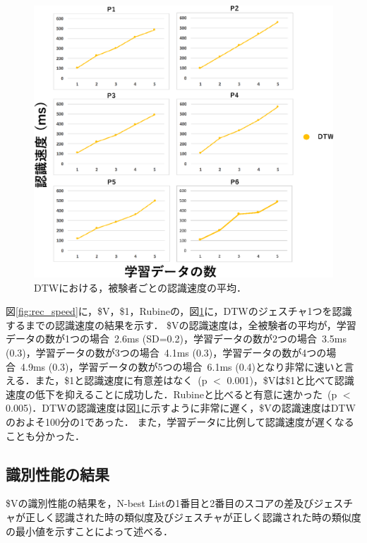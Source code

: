 \begin{figure}[!h]
\centering
\includegraphics[width=1.0\columnwidth]{img/rec_speed_dtw.eps}
\caption{DTWにおける，被験者ごとの認識速度の平均．}
\label{fig:rec_speed_dtw}
\end{figure}

図\ref{fig:rec_speed}に，\$V，\$1，Rubineの，図\ref{fig:rec_speed_dtw}に，DTWのジェスチャ1つを認識するまでの認識速度の結果を示す．
\$Vの認識速度は，全被験者の平均が，学習データの数が1つの場合~2.6ms (SD=0.2)，学習データの数が2つの場合~3.5ms (0.3)，学習データの数が3つの場合~4.1ms (0.3)，学習データの数が4つの場合~4.9ms (0.3)，学習データの数が5つの場合~6.1ms (0.4)となり非常に速いと言える．また，\$1と認識速度に有意差はなく~(p $<$ 0.001)，\$Vは\$1と比べて認識速度の低下を抑えることに成功した．Rubineと比べると有意に速かった~(p $<$ 0.005)．DTWの認識速度は図\ref{fig:rec_speed_dtw}に示すように非常に遅く，\$Vの認識速度はDTWのおよそ100分の1であった．
また，学習データに比例して認識速度が遅くなることも分かった．

\clearpage
\subsection{識別性能の結果}
\$Vの識別性能の結果を，N-best Listの1番目と2番目のスコアの差及びジェスチャが正しく認識された時の類似度及びジェスチャが正しく認識された時の類似度の最小値を示すことによって述べる．

